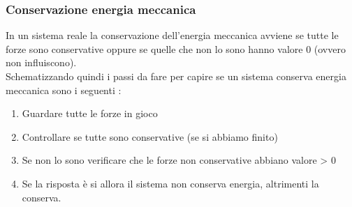 \documentclass[portrait]{article}
\begin{document}
\subsubsection{Conservazione energia meccanica}
In un sistema reale la conservazione dell'energia meccanica avviene se tutte le forze sono conservative oppure se quelle che non lo sono hanno valore 0 (ovvero non influiscono). \\
Schematizzando quindi i passi da fare per capire se un sistema conserva energia meccanica sono i seguenti : 
\begin{enumerate}
\item Guardare tutte le forze in gioco
\item Controllare se tutte sono conservative (se si abbiamo finito)
\item Se non lo sono verificare che le forze non conservative abbiano valore > 0 
\item Se la risposta è si allora il sistema non conserva energia, altrimenti la conserva.
\end{enumerate}
\end{document}
